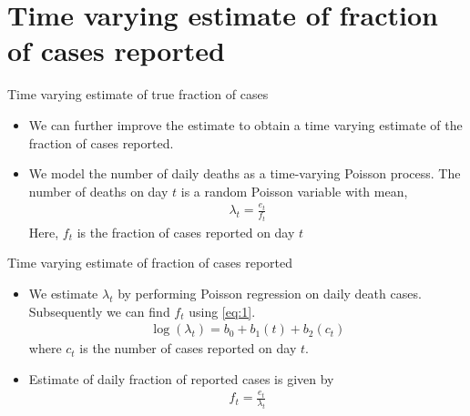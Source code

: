 \documentclass[10pt]{beamer}
\begin{document}
\section{Time varying estimate of fraction of cases reported}
\begin{frame}{Time varying estimate of true fraction of cases}
        \begin{itemize}
            \item We can further improve the estimate to obtain a time varying estimate of the fraction of cases reported.
            \item We model the number of daily deaths as a time-varying Poisson process. The number of deaths on day $t$ is a random Poisson variable with mean,
\begin{align}
    \lambda_t = \frac{e_t}{f_t} \label{eq:1}
\end{align}
Here, $f_t$ is the fraction of cases reported on day $t$
        \end{itemize}
\end{frame}
\begin{frame}{Time varying estimate of fraction of cases reported}
    \begin{itemize}
        \item We estimate $\lambda_t$ by performing Poisson regression on daily death cases. Subsequently we can find $f_t$ using \eqref{eq:1}.
        \begin{align}
            \log (\lambda_t) = b_0 + b_1(t) + b_2(c_t)
        \end{align}
        where $c_t$ is the number of cases reported on day $t$.
        
    \item Estimate of daily fraction of reported cases is given by
    \begin{align}
        f_t = \frac{e_t}{\lambda_t}
    \end{align}
    \end{itemize}
\end{frame}
\end{document}
